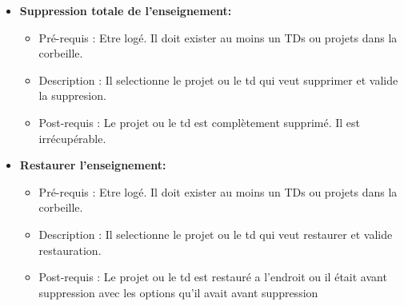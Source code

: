 \begin{itemize}
\item {\bf Suppression totale de l'enseignement:}
	\begin{itemize}
	\item Pr{\'e}-requis : Etre log{\'e}. Il doit exister au moins un TDs ou projets dans la corbeille.\\
	\item Description : Il selectionne le projet ou le td qui veut supprimer et valide la suppresion.\\
	\item Post-requis : Le projet ou le td est compl{\`e}tement supprim{\'e}. Il est irr{\'e}cup{\'e}rable.
	\end{itemize}
\item {\bf Restaurer l'enseignement:}
	\begin{itemize}
	\item Pr{\'e}-requis : Etre log{\'e}. Il doit exister au moins un TDs ou projets dans la corbeille.\\
	\item Description : Il selectionne le projet ou le td qui veut restaurer et valide restauration.\\
	\item Post-requis : Le projet ou le td est restaur{\'e} a l'endroit ou il {\'e}tait avant suppression avec les options qu'il avait avant suppression
	\end{itemize}
\end{itemize}